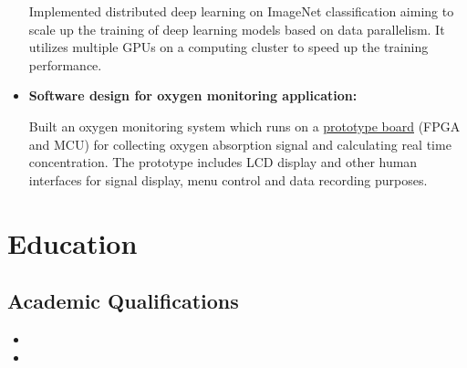 \documentclass[11pt,a4paper,geogia]{moderncv}        %
\begin{document}
\begin{itemize}
{						Implemented distributed deep learning on ImageNet classification aiming to scale up the training of deep learning models based on data parallelism. It utilizes multiple GPUs on a computing cluster to speed up the training performance.}
					
					\vspace{6pt}
					
					\item{\textbf{Software design for oxygen monitoring application:}
						
						\vspace{3pt}
						
						Built an oxygen monitoring system which runs on a \href{https://hma02.github.io/AllanMa/index.html#oxygen}{prototype board} (FPGA and MCU) for collecting oxygen absorption signal and calculating real time concentration. The prototype includes LCD display and other human interfaces for signal display, menu control and data recording purposes.}
				\end{itemize}
				
				\vspace{2pt}
				
				
				\section{Education}
				
				\vspace{5pt}
				
				\subsection{Academic Qualifications}
				
				\vspace{5pt}
				
				\begin{itemize}
					
					\item{}
					\vspace{6pt}
					\item{}  %
					
				\end{itemize}
				
\end{document}
